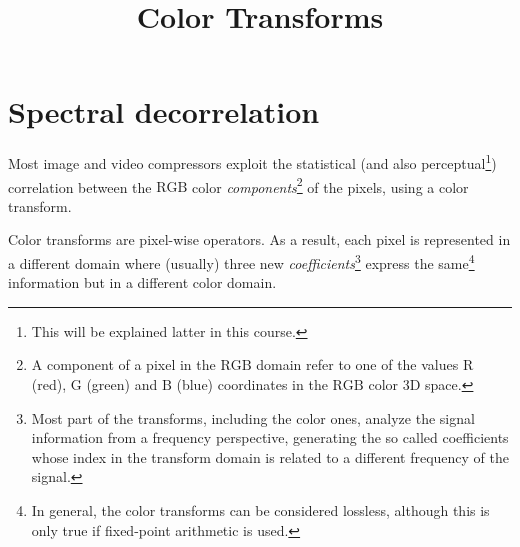 
%


\title{Color Transforms}

\maketitle
\tableofcontents

\section{Spectral decorrelation}

Most image and video compressors exploit the statistical (and also
perceptual\footnote{This will be explained latter in this course.})
correlation between the $\text{RGB}$ color
\emph{components}\footnote{A component of a pixel in the $\text{RGB}$
domain refer to one of the values $\text{R}$ (red), $\text{G}$ (green)
and $\text{B}$ (blue) coordinates in the $\text{RGB}$ color 3D space.}
of the pixels, using a color transform.

Color transforms are pixel-wise operators. As a result, each pixel is
represented in a different domain where (usually) three new
\emph{coefficients}\footnote{Most part of the transforms, including
the color ones, analyze the signal information from a frequency
perspective, generating the so called coefficients whose index in the
transform domain is related to a different frequency of the signal.}
express the same\footnote{In general, the color transforms can be
considered lossless, although this is only true if fixed-point
arithmetic is used.} information but in a different color domain.

